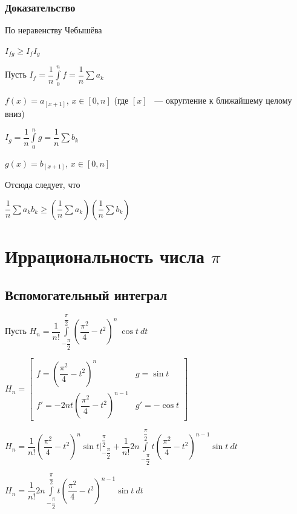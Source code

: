 \documentclass{article}
\begin{document}
            \subsubsection{Доказательство}
            
                По неравенству Чебышёва
                
                $I_{fg} \geq I_f I_g$
                
                Пусть $I_f = \dfrac{1}{n} \int\limits^n_0 f = \dfrac{1}{n} \sum a_k$
                
                $f(x) = a_{[x + 1]}$, $x \in [0, n]$ (где $[x]$ ~--- округление к ближайшему целому вниз)
                
                $I_g = \dfrac{1}{n} \int\limits^n_0 g = \dfrac{1}{n} \sum b_k$
                
                $g(x) = b_{[x + 1]}$, $x \in [0, n]$
                
                Отсюда следует, что
                
                $\dfrac{1}{n} \sum a_k b_k \geq \left( \dfrac{1}{n} \sum a_k \right) \left( \dfrac{1}{n} \sum b_k \right)$
                
	\newpage
	
	\section{Иррациональность числа $\pi$}
	
		\subsection{Вспомогательный интеграл}
		
			Пусть $H_n = \dfrac{1}{n!} \int\limits^{\dfrac{\pi}{2}}_{-\dfrac{\pi}{2}} \left(\dfrac{\pi^2}{4}-t^2\right)^n \ \cos t \ dt$
			
			$H_n = \begin{bmatrix} f = \left(\dfrac{\pi^2}{4} - t^2\right)^n & g = \sin t \\ f' = -2nt \left(\dfrac{\pi^2}{4} - t^2\right)^{n - 1} & g' = -\cos t \end{bmatrix}$
			
			$H_n = \dfrac{1}{n!} \left(\dfrac{\pi^2}{4} - t^2\right)^n \sin t \bigg|^{\dfrac{\pi}{2}}_{-\dfrac{\pi}{2}} + \dfrac{1}{n!} 2n \int\limits^{\dfrac{\pi}{2}}_{-\dfrac{\pi}{2}} t (\dfrac{\pi^2}{4}-t^2)^{n - 1} \sin t \ dt$
			
			$H_n = \dfrac{1}{n!} 2n \int\limits^{\dfrac{\pi}{2}}_{-\dfrac{\pi}{2}} t (\dfrac{\pi^2}{4}-t^2)^{n - 1} \sin t \ dt$
			
\end{document}

